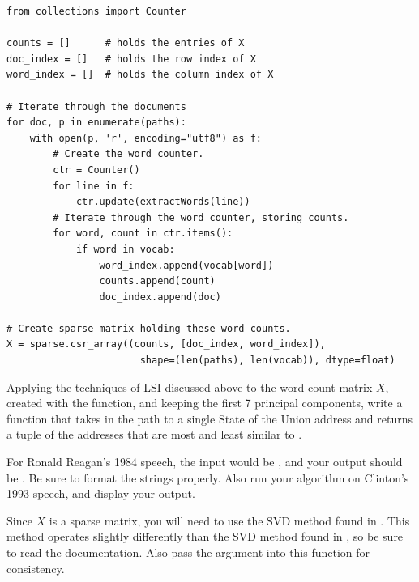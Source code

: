 \begin{lstlisting}
from collections import Counter

counts = []      # holds the entries of X
doc_index = []   # holds the row index of X
word_index = []  # holds the column index of X

# Iterate through the documents
for doc, p in enumerate(paths):
    with open(p, 'r', encoding="utf8") as f:
        # Create the word counter.
        ctr = Counter()
        for line in f:
            ctr.update(extractWords(line))
        # Iterate through the word counter, storing counts.
        for word, count in ctr.items():
            if word in vocab:
                word_index.append(vocab[word])
                counts.append(count)
                doc_index.append(doc)

# Create sparse matrix holding these word counts.
X = sparse.csr_array((counts, [doc_index, word_index]),
                       shape=(len(paths), len(vocab)), dtype=float)
\end{lstlisting}

\begin{problem} %
Applying the techniques of LSI discussed above to the word count matrix $X$, created with the  function, and keeping the first 7 principal components, write a function that takes in the path to a single State of the Union address  and returns a tuple of the addresses that are most and least similar to .

For Ronald Reagan's 1984 speech, the input would be , and your output should be .
Be sure to format the strings properly.
Also run your algorithm on Clinton's 1993 speech, and display your output.

Since $X$ is a sparse matrix, you will need to use the SVD method found in .
This method operates slightly differently than the SVD method found in , so be sure to read the documentation.
Also pass the argument  into this function for consistency.
\label{prob:LSI1}
\end{problem}

